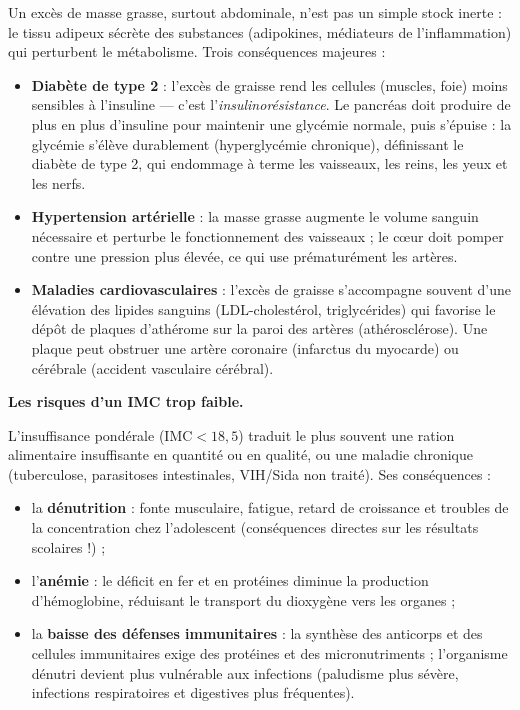\documentclass[11pt]{article}
\newcommand{\cle}[1]{{\popxbold\color{popdark}#1}}
\begin{document}
Un excès de masse grasse, surtout abdominale, n'est pas un simple stock inerte : le tissu adipeux sécrète des substances (adipokines, médiateurs de l'inflammation) qui perturbent le métabolisme. Trois conséquences majeures :
\begin{itemize}
\item \textbf{Diabète de type 2} : l'excès de graisse rend les cellules (muscles, foie) moins sensibles à l'\cle{insuline} — c'est l'\emph{insulinorésistance}. Le pancréas doit produire de plus en plus d'insuline pour maintenir une glycémie normale, puis s'épuise : la glycémie s'élève durablement (hyperglycémie chronique), définissant le diabète de type 2, qui endommage à terme les vaisseaux, les reins, les yeux et les nerfs.
\item \textbf{Hypertension artérielle} : la masse grasse augmente le volume sanguin nécessaire et perturbe le fonctionnement des vaisseaux ; le cœur doit pomper contre une pression plus élevée, ce qui use prématurément les artères.
\item \textbf{Maladies cardiovasculaires} : l'excès de graisse s'accompagne souvent d'une élévation des lipides sanguins (LDL-cholestérol, triglycérides) qui favorise le dépôt de plaques d'\cle{athérome} sur la paroi des artères (athérosclérose). Une plaque peut obstruer une artère coronaire (infarctus du myocarde) ou cérébrale (accident vasculaire cérébral).
\end{itemize}

\textbf{Les risques d'un IMC trop faible.}\par

L'insuffisance pondérale ($\mathrm{IMC} < 18,5$) traduit le plus souvent une ration alimentaire insuffisante en quantité ou en qualité, ou une maladie chronique (tuberculose, parasitoses intestinales, VIH/Sida non traité). Ses conséquences :
\begin{itemize}
\item la \textbf{dénutrition} : fonte musculaire, fatigue, retard de croissance et troubles de la concentration chez l'adolescent (conséquences directes sur les résultats scolaires !) ;
\item l'\textbf{anémie} : le déficit en fer et en protéines diminue la production d'hémoglobine, réduisant le transport du dioxygène vers les organes ;
\item la \textbf{baisse des défenses immunitaires} : la synthèse des anticorps et des cellules immunitaires exige des protéines et des micronutriments ; l'organisme dénutri devient plus vulnérable aux infections (paludisme plus sévère, infections respiratoires et digestives plus fréquentes).
\end{itemize}
\end{document}
